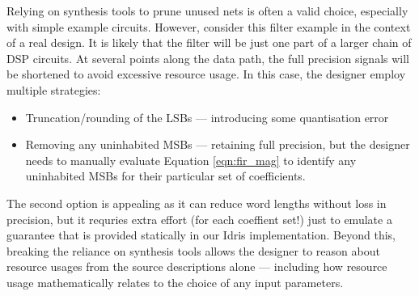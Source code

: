 \documentclass[conference]{IEEEtran}
\begin{document}
Relying on synthesis tools to prune unused nets is often a valid choice,
especially with simple example circuits. However, consider this filter example
in the context of a real design. It is likely that the filter will be just one
part of a larger chain of DSP circuits. At several points along the data path,
the full precision signals will be shortened to avoid excessive resource
usage. In this case, the designer employ multiple strategies:

\begin{itemize}
\item Truncation/rounding of the LSBs --- introducing some quantisation error
\item Removing any uninhabited MSBs --- retaining full precision, but the
  designer needs to manually evaluate Equation \ref{eqn:fir_mag} to identify any
  uninhabited MSBs for their particular set of coefficients.
\end{itemize}

The second option is appealing as it can reduce word lengths without loss in
precision, but it requries extra effort (for each coeffient set!) just to
emulate a guarantee that is provided statically in our Idris implementation.
Beyond this, breaking the reliance on synthesis tools allows the designer to
reason about resource usages from the source descriptions alone --- including
how resource usage mathematically relates to the choice of any input parameters.

\end{document}
